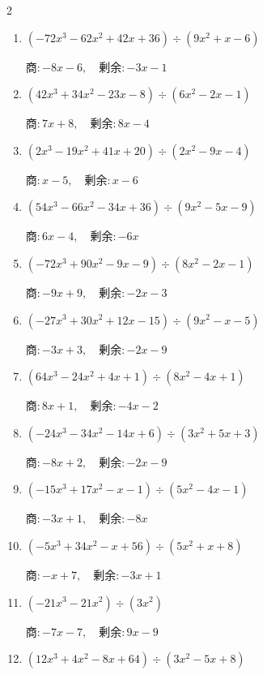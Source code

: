 \begin{multicols}{2}
\begin{enumerate}
  \item $(-72x^{3}-62x^{2}+42x+36) \div (9x^{2}+x-6)$

        $商 : -8x-6, \quad 剰余 : -3x-1$

  \item $(42x^{3}+34x^{2}-23x-8) \div (6x^{2}-2x-1)$

        $商 : 7x+8, \quad 剰余 : 8x-4$

\columnbreak %

  \item $(2x^{3}-19x^{2}+41x+20) \div (2x^{2}-9x-4)$

        $商 : x-5, \quad 剰余 : x-6$

  \item $(54x^{3}-66x^{2}-34x+36) \div (9x^{2}-5x-9)$

        $商 : 6x-4, \quad 剰余 : -6x$

  \item $(-72x^{3}+90x^{2}-9x-9) \div (8x^{2}-2x-1)$

        $商 : -9x+9, \quad 剰余 : -2x-3$

  \item $(-27x^{3}+30x^{2}+12x-15) \div (9x^{2}-x-5)$

        $商 : -3x+3, \quad 剰余 : -2x-9$

  \item $(64x^{3}-24x^{2}+4x+1) \div (8x^{2}-4x+1)$

        $商 : 8x+1, \quad 剰余 : -4x-2$

\columnbreak %

\resetques

  \item $(-24x^{3}-34x^{2}-14x+6) \div (3x^{2}+5x+3)$

        $商 : -8x+2, \quad 剰余 : -2x-9$

  \item $(-15x^{3}+17x^{2}-x-1) \div (5x^{2}-4x-1)$

        $商 : -3x+1, \quad 剰余 : -8x$

  \item $(-5x^{3}+34x^{2}-x+56) \div (5x^{2}+x+8)$

        $商 : -x+7, \quad 剰余 : -3x+1$

  \item $(-21x^{3}-21x^{2}) \div (3x^{2})$

        $商 : -7x-7, \quad 剰余 : 9x-9$

  \item $(12x^{3}+4x^{2}-8x+64) \div (3x^{2}-5x+8)$


\end{enumerate}
\end{multicols}
